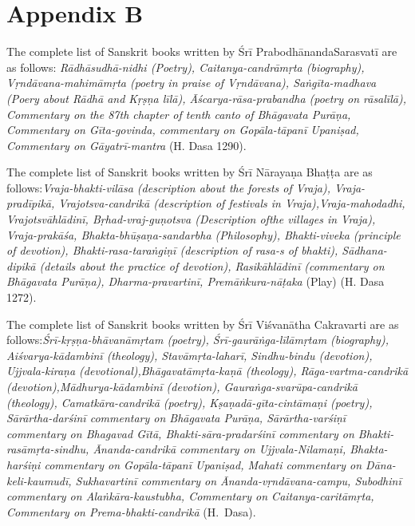 \section*{Appendix B}

{\rm The complete list of Sanskrit books written by Śrī Prabodhānanda\break Sarasvatī are as follows:} {\sl Rādhāsudhā-nidhi {\rm (Poetry)}, Caitanya-candrā\-mṛta {\rm (biography)}, Vṛndāvana-mahimāmṛta {\rm (poetry in praise of Vṛndāvana)}, Saṅgīta-madhava {\rm (Poery about Rādhā and Kṛṣṇa {\sl līlā})}, Āścarya-\Break rāsa-prabandha {\rm (poetry on {\sl rāsalīlā})}, {\rm Commentary on the 87th chapter of tenth canto of} Bhāgavata Purāṇa, {\rm Commentary on} Gīta-govinda, {\rm commentary on} Gopāla-tāpanī Upaniṣad, {\rm Commentary on} Gāyatrī-mantra} {\rm (H. Dasa 1290)}. 
\newpage

The complete list of Sanskrit books written by Śrī Nārayaṇa Bhaṭṭa are as follows:{\sl  Vraja-bhakti-vilāsa {\rm (description about the forests of Vraja)}, Vraja-pradīpikā, Vrajotsva-candrikā {\rm (description of festivals in Vraja)},\break Vraja-mahodadhi, Vrajotsvāhlādinī, Bṛhad-vraj-guṇotsva {\rm (Description of\break the villages in Vraja)}, Vraja-prakāśa, Bhakta-bhūṣaṇa-sandarbha {\rm (Philosophy)}, Bhakti-viveka {\rm (principle of devotion)}, Bhakti-rasa-taraṅgiṇī {\rm (description of {\sl rasa}-s of {\sl bhakti})}, Sādhana-dipikā {\rm (details about the practice of devotion)}, Rasikāhlādinī {\rm (commentary on {\sl Bhāgavata Purāṇa})}, Dharma-pra\-vartinī, Premāṅkura-nāṭaka} {\rm (Play)} {\rm (H. Dasa 1272)}. 

{\rm The complete list of Sanskrit books written by Śrī Viśvanātha Cakra\-varti are as follows:}{\sl  Śrī-kṛṣṇa-bhāvanāmṛtam {\rm (poetry)}, Śrī-gaurāṅga-līlā\-mṛtam {\rm (biography)}, Aiśvarya-kādambinī {\rm (theology)}, Stavāmṛta-laharī, Sindhu-bindu {\rm (devotion)}, Ujjvala-kiraṇa  {\rm (devotional)},\break Bhāgavatāmṛta-kaṇā {\rm (theology)}, Rāga-vartma-candrikā {\rm (devotion)},\break Mādhurya-kādambinī {\rm (devotion)}, Gauraṅga-svarūpa-candrikā {\rm (theology)}, Camatkāra-candrikā {\rm (poetry)}, Kṣaṇadā-gīta-cintāmaṇi {\rm (poetry)}, Sārārtha-darśinī {\rm commentary on} Bhāgavata Purāṇa, Sārārtha-varśiṇī {\rm commentary on} Bhagavad Gītā, Bha\-kti-sāra-pradarśinī {\rm commentary on} Bhakti-rasā\-mṛ\-ta-sindhu, Ānanda-ca\-ndri\-kā {\rm commentary on} Ujjvala-Nilamaṇi, Bhakta-\Break harśiṇi {\rm commentary on} Gopāla-tāpanī Upaniṣad, Mahati {\rm commentary on} Dāna-keli-kaumudī, Sukhavartinī {\rm commentary on} Ānanda-vṛndāvana-\Break campu, Subodhinī commentary on Alaṅ\-kāra-kaustubha, {\rm Commentary on} Caitanya-caritā\-mṛta, {\rm Commentary on} Prema-bhakti-candrikā} {\rm (H.~Dasa)}. 

